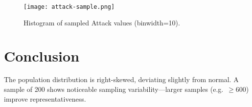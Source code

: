 \documentclass[11pt]{article}
\begin{document}
\begin{figure}[h!]
  \centering
  \texttt{[image: attack-sample.png]}
  \caption{Histogram of sampled Attack values (binwidth=10).}
\end{figure}

\section{Conclusion}
The population distribution is right-skewed, deviating slightly from normal.  
A sample of 200 shows noticeable sampling variability—larger samples (e.g.\ $\ge600$) improve representativeness.
\end{document}
